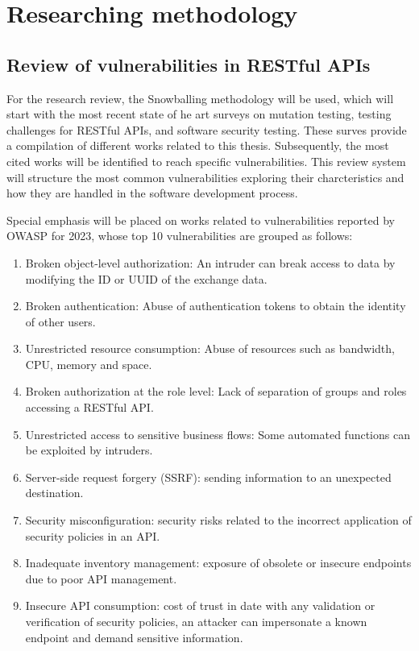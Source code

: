 \section{Researching methodology}

\subsection{ Review of vulnerabilities in RESTful APIs} 

For the research review, the Snowballing methodology\cite{Chaim2008}  will be used, which will start with the most recent state of he art surveys on mutation testing\cite{Papadakis2019}, testing challenges for RESTful APIs\cite{Ehsan2022}, and software security testing\cite{Golmohammadi2023}. These surves provide a compilation of different works related to this thesis. Subsequently, the most cited works will be identified to reach specific vulnerabilities. This review system will structure the most common vulnerabilities exploring their charcteristics and how they are handled in the software development process.

Special emphasis will be placed on works related to vulnerabilities reported by OWASP for 2023, whose top 10 vulnerabilities are grouped as follows:

\begin{enumerate}
    \item Broken object-level authorization: An intruder can break access to data by modifying the ID or UUID of the exchange data.
    \item Broken authentication: Abuse of authentication tokens to obtain the identity of other users.
    \item Unrestricted resource consumption: Abuse of resources such as bandwidth, CPU, memory and space.
    \item Broken authorization at the role level: Lack of separation of groups and roles accessing a RESTful API.
    \item Unrestricted access to sensitive business flows: Some automated functions can be exploited by intruders.
    \item Server-side request forgery (SSRF): sending information to an unexpected destination.
    \item Security misconfiguration: security risks related to the incorrect application of security policies in an API.
    \item Inadequate inventory management: exposure of obsolete or insecure endpoints due to poor API management.
    \item Insecure API consumption: cost of trust in date with any validation or verification of security policies, an attacker can impersonate a known endpoint and demand sensitive information.
\end{enumerate}

